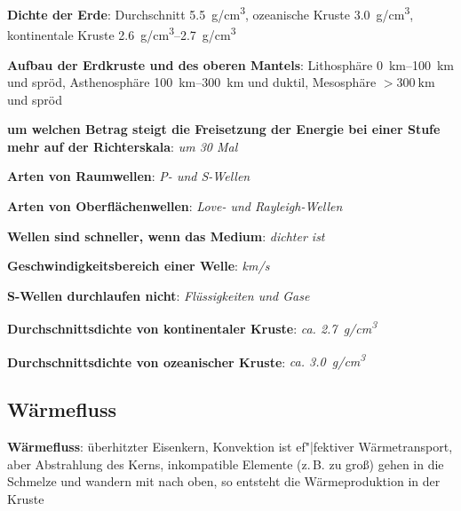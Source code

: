 \textbf{Dichte der Erde}:
Durchschnitt \SI{5.5}{\gram/\centi\meter\cubed},
ozeanische Kruste \SI{3.0}{\gram/\centi\meter\cubed},
kontinentale Kruste \SIrange{2.6}{2.7}{\gram/\centi\meter\cubed}

\textbf{Aufbau der Erdkruste und des oberen Mantels}:
Lithosphäre \SIrange{0}{100}{\kilo\meter} und spröd,
Asthenosphäre \SIrange{100}{300}{\kilo\meter} und duktil,
Mesosphäre $> \SI{300}{\kilo\meter}$ und spröd

\begin{wichtig}
    \item
    \textbf{um welchen Betrag steigt die Freisetzung der Energie bei einer Stufe mehr
    auf der Richterskala}:
    \emph{um 30 Mal}
    
    \item
    \textbf{Arten von Raumwellen}:
    \emph{P- und S-Wellen}
    
    \item
    \textbf{Arten von Oberflächenwellen}:
    \emph{Love- und Rayleigh-Wellen}
    
    \item
    \textbf{Wellen sind schneller, wenn das Medium}:
    \emph{dichter ist}
    
    \item
    \textbf{Geschwindigkeitsbereich einer Welle}:
    \emph{\si[math-rm=\mathit,text-rm=\itshape]{\kilo\meter/\second}}
    
    \item
    \textbf{S-Wellen durchlaufen nicht}:
    \emph{Flüssigkeiten und Gase}
    
    \item
    \textbf{Durchschnittsdichte von kontinentaler Kruste}:
    \emph{ca. \SI[math-rm=\mathit,text-rm=\itshape]{2.7}{\gram/\centi\meter^3}}
    
    \item
    \textbf{Durchschnittsdichte von ozeanischer Kruste}:
    \emph{ca. \SI[math-rm=\mathit,text-rm=\itshape]{3.0}{\gram/\centi\meter^3}}
\end{wichtig}

\pagebreak

\subsection{%
    Wärmefluss%
}

\textbf{Wärmefluss}:
überhitzter Eisenkern,
Konvektion ist ef"|fektiver Wärmetransport,
aber Abstrahlung des Kerns,
inkompatible Elemente (z.\,B. zu groß) gehen in die Schmelze und wandern mit nach oben,
so entsteht die Wärmeproduktion in der Kruste

